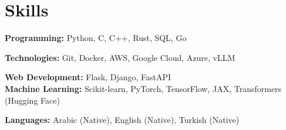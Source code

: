\documentclass[letterpaper,11pt]{article}
\newcommand{\resumeSubHeadingListStart}{\begin{itemize}[leftmargin=0.15in, label={}]}
\newcommand{\resumeSubHeadingListEnd}{\end{itemize}}
\begin{document}
\section{Skills}
  \vspace{2pt}
  \resumeSubHeadingListStart
    \small{\item{
        \textbf{Programming:}{ Python, C, C++, Rust, SQL, Go} \\ \vspace{3pt}
        
        \textbf{Technologies:}{ Git, Docker, AWS, Google Cloud, Azure, vLLM} \\ \vspace{3pt}

        \textbf{Web Development:}{ Flask, Django, FastAPI} \\ \vspace{3pt}
        \textbf{Machine Learning:}{ Scikit-learn, PyTorch, TensorFlow, JAX, Transformers (Hugging Face)} \\ \vspace{3pt}

        \textbf{Languages:}{ Arabic (Native), English (Native), Turkish (Native)}
        
    }}
  \resumeSubHeadingListEnd







\end{document}

